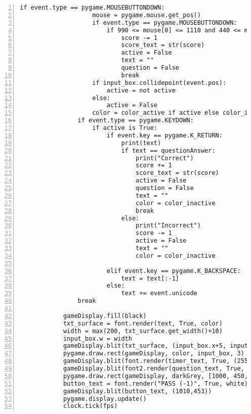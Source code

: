 \documentclass[12pt]{report}
\begin{document}
\tiny
\begin{Verbatim}[numbers=left, frame=single] 
 if event.type == pygame.MOUSEBUTTONDOWN:
                    mouse = pygame.mouse.get_pos()
                    if event.type == pygame.MOUSEBUTTONDOWN:
                        if 990 <= mouse[0] <= 1110 and 440 <= mouse[1] <= 490:
                            score -= 1
                            score_text = str(score)
                            active = False
                            text = ""
                            question = False
                            break
                    if input_box.collidepoint(event.pos):
                        active = not active
                    else:
                        active = False
                    color = color_active if active else color_inactive
                if event.type == pygame.KEYDOWN:
                    if active is True:
                        if event.key == pygame.K_RETURN:
                            print(text)
                            if text == questionAnswer:
                                print("Correct")
                                score += 1
                                score_text = str(score)
                                active = False
                                question = False
                                text = ""
                                color = color_inactive
                                break
                            else:
                                print("Incorrect")
                                score -= 1
                                active = False
                                text = ""
                                color = color_inactive
                                                            
                        elif event.key == pygame.K_BACKSPACE:
                            text = text[:-1]
                        else:
                            text += event.unicode
                break
            
            gameDisplay.fill(black)
            txt_surface = font.render(text, True, color)                                        
            width = max(200, txt_surface.get_width()+10)                                        
            input_box.w = width
            gameDisplay.blit(txt_surface, (input_box.x+5, input_box.y+5))                       
            pygame.draw.rect(gameDisplay, color, input_box, 3)                                  
            gameDisplay.blit(font.render(timer_text, True, (255, 255, 255)), (8, 7))
            gameDisplay.blit(font2.render(question_text, True, (255, 255, 255)), (80, 70))
            pygame.draw.rect(gameDisplay, darkGrey, [1000, 450, 100 , 30])
            button_text = font.render("PASS (-1)", True, white)
            gameDisplay.blit(button_text, (1010,453))
            pygame.display.update()                                                             
            clock.tick(fps)
\end{Verbatim}
\normalsize
\end{document}

